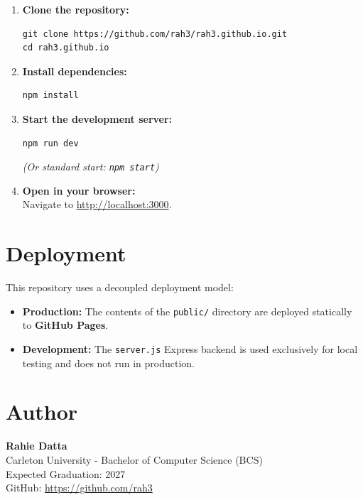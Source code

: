 \documentclass{article}
\begin{document}
\begin{enumerate}
    \item \textbf{Clone the repository:}
\begin{lstlisting}[style=codeblock]
git clone https://github.com/rah3/rah3.github.io.git
cd rah3.github.io
\end{lstlisting}

    \item \textbf{Install dependencies:}
\begin{lstlisting}[style=codeblock]
npm install
\end{lstlisting}

    \item \textbf{Start the development server:}
\begin{lstlisting}[style=codeblock]
npm run dev
\end{lstlisting}
    \textit{(Or standard start: \texttt{npm start})}

    \item \textbf{Open in your browser:} \\
    Navigate to \url{http://localhost:3000}.
\end{enumerate}

\section{Deployment}

This repository uses a decoupled deployment model:
\begin{itemize}
    \item \textbf{Production:} The contents of the \texttt{public/} directory are deployed statically to \textbf{GitHub Pages}.
    \item \textbf{Development:} The \texttt{server.js} Express backend is used exclusively for local testing and does not run in production.
\end{itemize}

\section{Author}

\textbf{Rahie Datta} \\
Carleton University - Bachelor of Computer Science (BCS) \\
Expected Graduation: 2027 \\
GitHub: \url{https://github.com/rah3}
\end{document}
